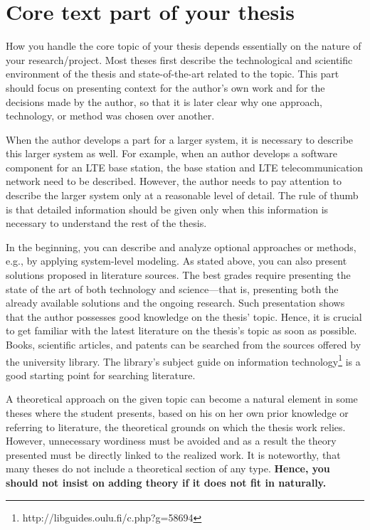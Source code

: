 \section{Core text part of your thesis}
\label{sec:core_text}

How you handle the core topic of your thesis depends essentially on the nature of your research/project. Most theses first describe the technological and scientific environment of the thesis and state-of-the-art related to the topic. This part should focus on presenting context for the author’s own work and for the decisions made by the author, so that it is later clear why one approach, technology, or method was chosen over another.

When the author develops a part for a larger system, it is necessary to describe this larger system as well. For example, when an author develops a software component for an LTE base station, the base station and LTE telecommunication network need to be described. However, the author needs to pay attention to describe the larger system only at a reasonable level of detail. The rule of thumb is that detailed information should be given only when this information is necessary to understand the rest of the thesis.

In the beginning, you can describe and analyze optional approaches or methods, e.g., by applying system-level modeling. As stated above, you can also present solutions proposed in literature sources. The best grades require presenting the state of the art of both technology and science---that is, presenting both the already available solutions and the ongoing research. Such presentation shows that the author possesses good knowledge on the thesis’ topic. Hence, it is crucial to get familiar with the latest literature on the thesis’s topic as soon as possible. Books, scientific articles, and patents can be searched from the sources offered by the university library. The library’s subject guide on information technology\footnote{ http://libguides.oulu.fi/c.php?g=58694} is a good starting point for searching literature.

A theoretical approach on the given topic can become a natural element in some theses where the student presents, based on his on her own prior knowledge or referring to literature, the theoretical grounds on which the
thesis work relies. However, unnecessary wordiness must be avoided and as a result the theory presented must be directly linked to the realized work. It is noteworthy, that many theses do not include a theoretical section of any type. \textbf{Hence, you should not insist on adding theory if it does not fit in naturally.}

